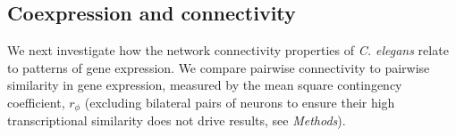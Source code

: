 \documentclass[10pt,letterpaper]{article}
\begin{document}

\subsection*{Coexpression and connectivity}

We next investigate how the network connectivity properties of \emph{C. elegans} relate to patterns of gene expression.
We compare pairwise connectivity to pairwise similarity in gene expression, measured by the mean square contingency coefficient, $r_\phi$ (excluding bilateral pairs of neurons to ensure their high transcriptional similarity does not drive results, see \emph{Methods}).
\end{document}
